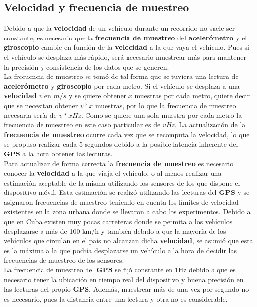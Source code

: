 	\subsection{Velocidad y frecuencia de muestreo}
		Debido a que la \textbf{velocidad} de un vehículo durante un recorrido no suele ser constante, es necesario que la \textbf
		{frecuencia de muestreo} del \textbf{acelerómetro} y el \textbf{giroscopio} cambie en función de la \textbf{velocidad}
		a la que vaya el vehículo. Pues si el vehículo se desplaza más rápido, será necesario muestrear más para mantener la
		precisión y consistencia de los datos que se generen.\\
		\indent La frecuencia de muestreo se tomó de tal forma que se tuviera una lectura de \textbf{acelerómetro} y \textbf
		{giroscopio} por cada metro. Si el vehículo se desplaza a una \textbf{velocidad} $v$ en $m/s$ y se quiere obtener
		$x$ muestras por cada metro, quiere decir que se necesitan obtener $v * x$ muestras, por lo que la frecuencia de muestreo
		necesaria sería de $v * x Hz$. Como se quiere una sola muestra por cada metro la frecuencia de muestreo
		en este caso particular es de $v Hz$. La actualización de la \textbf{frecuencia de muestreo} ocurre cada vez que se recomputa
		la velocidad, lo que se propuso realizar cada 5 segundos debido a la posible latencia inherente del \textbf{GPS} a la hora
		obtener las lecturas.\\
		\indent Para actualizar de forma correcta la \textbf{frecuencia de muestreo} es necesario conocer la \textbf{velocidad}
		a la que viaja el vehículo, o al menos realizar una estimación aceptable de la misma utilizando los sensores de
		los que dispone el dispositivo móvil. Esta estimación se realizó utilizando las lecturas del \textbf{GPS} y se 
		asignaron frecuencias de muestreo teniendo en cuenta los límites de velocidad existentes en la zona urbana donde 
		se llevaron a cabo los experimentos. Debido a que en Cuba existen muy pocas carreteras donde se permita a
		los vehículos desplazarse a más de 100 km/h y también debido a que la mayoría de los vehículos que circulan en
		el país no alcanzan dicha \textbf{velocidad}, se asumió que esta es la máxima a la que podría desplazarse un
		vehículo a la hora de decidir las frecuencias de muestreo de los sensores.\\
		\indent La frecuencia de muestreo del \textbf{GPS} se fijó constante en 1Hz debido a que es necesario tener 
		la ubicación en tiempo real del dispositivo y buena precisión en las lecturas del propio \textbf{GPS}. Además, 
		muestrear más de una vez por segundo no es necesario, pues la distancia entre una lectura y otra no es considerable.\\

